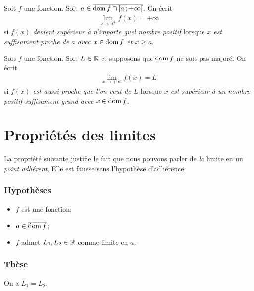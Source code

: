 \documentclass[main.tex]{subfiles}
\begin{document}
\begin{definition}

    Soit $f$ une fonction.
    Soit $a \in \overline{\operatorname{dom} f \cap \mathopen{[}a\,;+\infty\mathclose{[}}$.
    On écrit
    \begin{align}
        \lim_{x \to a^+} f(x) = +\infty
    \end{align}
    si \emph{$f(x)$ devient supérieur à n'importe quel nombre positif}
    lorsque \emph{$x$ est suffisament proche de $a$ avec $x \in \operatorname{dom} f$ et $x \geq a$}.
\end{definition}

\begin{definition}

    Soit $f$ une fonction.
    Soit $L \in \mathbb{R}$ et supposons que $\operatorname{dom} f$ ne soit pas majoré.
    On écrit
    \begin{align}
        \lim_{x \to +\infty} f(x) = L
    \end{align}
    si \emph{$f(x)$ est aussi proche que l'on veut de $L$}
    lorsque \emph{$x$ est supérieur à un nombre positif suffisament grand avec $x \in \operatorname{dom} f$}.
\end{definition}

\section{Propriétés des limites}

La propriété suivante justifie le fait que nous pouvons parler de \emph{la} limite en un \emph{point adhérent}.
Elle est fausse sans l'hypothèse d'adhérence.

\begin{proposition}

    \subsubsection*{Hypothèses}
    \begin{itemize}
        \item $f$ est une fonction;
        \item $a \in \overline{\operatorname{dom} f}$;
        \item $f$ admet $L_1, L_2 \in \mathbb{R}$ comme limite en $a$.
    \end{itemize}

    \subsubsection*{Thèse}
    On a $L_1 = L_2$.
\end{proposition}
\end{document}
